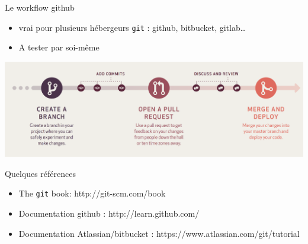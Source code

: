 \begin{frame}[fragile]{%
\protect\hypertarget{le-workflow-github}{%
Le workflow github}}

\begin{itemize}
\tightlist
\item
  vrai pour plusieurs hébergeurs \texttt{git} : github, bitbucket,
  gitlab\ldots{}
\item
  A tester par soi-même
\end{itemize}

\includegraphics[width=1\textwidth]{images/github-workflow.png}

\end{frame}

\begin{frame}[fragile]{%
\protect\hypertarget{quelques-ruxe9fuxe9rences}{%
Quelques références}}

\begin{itemize}
\tightlist
\item
  The \texttt{git} book: http://git-scm.com/book
\item
  Documentation github : http://learn.github.com/
\item
  Documentation Atlassian/bitbucket :
  https://www.atlassian.com/git/tutorial
\end{itemize}

\end{frame}
